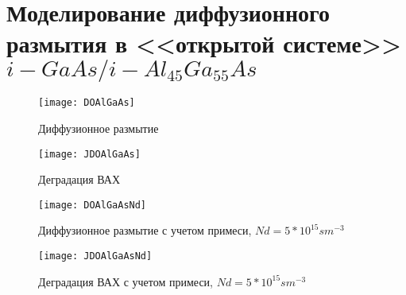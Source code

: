 

\section{Моделирование диффузионного размытия в <<открытой системе>> $i\!-\!GaAs/i\!-\!Al_{45}Ga_{55}As$}
\begin{figure}[h]
  \centering
  \texttt{[image: DOAlGaAs]}
  \caption{Диффузионное размытие}
\end{figure}

\begin{figure}[h]
  \centering
  \texttt{[image: JDOAlGaAs]}
  \caption{Деградация ВАХ}
\end{figure}

\begin{figure}[h]
  \centering
  \texttt{[image: DOAlGaAsNd]}
  \caption{Диффузионное размытие с учетом примеси, $Nd = 5*10^{15}sm^{-3}$}
\end{figure}

\begin{figure}[h]
  \centering
  \texttt{[image: JDOAlGaAsNd]}
  \caption{Деградация ВАХ с учетом примеси, $Nd = 5*10^{15}sm^{-3}$}
\end{figure}